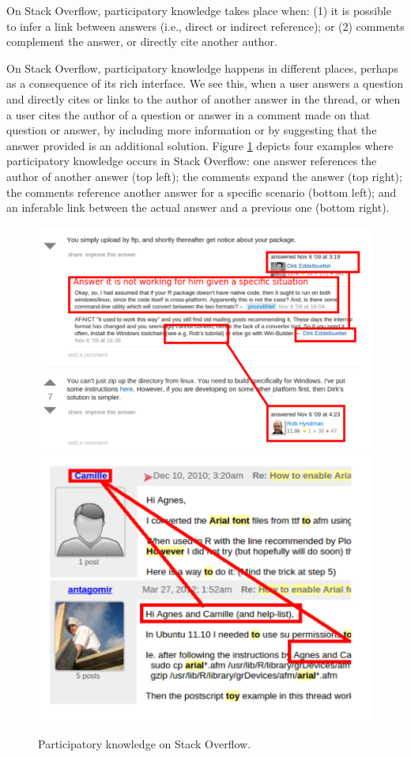 \documentclass{sig-alternate-05-2015}
\begin{document}
	On Stack Overflow, participatory knowledge takes place when:
	(1) it is possible to infer a link between answers (i.e., direct or indirect reference); or
	(2) comments complement the answer, or directly cite another author.

	On Stack Overflow, participatory knowledge happens in different places, perhaps as a consequence of its rich interface.
	We see this, when a user answers a question and directly cites or links to the author of another answer in the thread, or when a user cites the author of a question or answer in a comment made on that question or answer, by including more information or by suggesting that the answer provided is an additional solution.
	Figure \ref{fig:SO-PK1} depicts four examples where participatory knowledge occurs in Stack Overflow: one answer references the author of another answer (top left); the comments expand the answer (top right); the comments reference another answer for a specific scenario (bottom left); and an inferable link between the actual answer and a previous one (bottom right).

	\begin{figure}[!htb]
		\centering
		\includegraphics[width=.8\columnwidth]{Figures/SO-PKimg5}
		\includegraphics[width=.8\columnwidth]{Figures/ML-PKimg1}
		\caption{Participatory knowledge on Stack Overflow.}
		\label{fig:SO-PK1}
	\end{figure}
\end{document}
